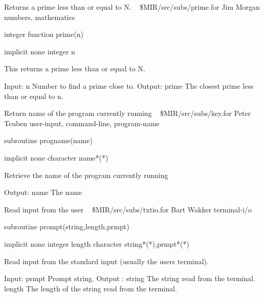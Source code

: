 %
\noindent Returns a prime less than or equal to N.
\newline \ 
\newline {} \$MIR/src/subs/prime.for
\newline {} Jim Morgan
\newline {} numbers, mathematics
\par{\tenpoint
{\eightpoint\begintt
        integer function prime(n)

        implicit none
        integer n

  This returns a prime less than or equal to N.

  Input:
    n          Number to find a prime close to.
  Output:
    prime      The closest prime less than or equal to n.
\endtt}
\par}
%
\noindent Return name of the program currently running
\newline \ 
\newline {} \$MIR/src/subs/key.for
\newline {} Peter Teuben
\newline \abox{Keywords:} user-input, command-line, program-name
\par{\tenpoint
{\eightpoint\begintt
        subroutine progname(name)

        implicit none
        character name*(*)

  Retrieve the name of the program currently running

  Output:
    name       The name
\endtt}
\par}
%
\noindent Read input from the user
\newline \ 
\newline {} \$MIR/src/subs/txtio.for
\newline \abox{Responsible:} Bart Wakker
\newline {} terminal-i/o
\par{\tenpoint
{\eightpoint\begintt
        subroutine prompt(string,length,prmpt)

        implicit none
        integer length
        character string*(*),prmpt*(*)

  Read input from the standard input (usually the users terminal).

  Input:
    prmpt      Prompt string.
  Output :
    string     The string read from the terminal.
    length     The length of the string read from the terminal.
\endtt}
\par}
